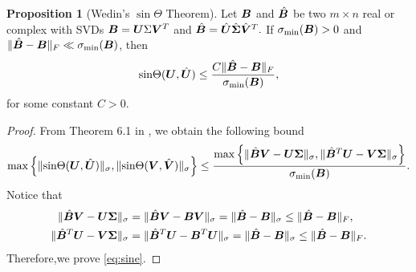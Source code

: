 \documentclass[12pt]{article}
\theoremstyle{definition}
\newtheorem{prop}{Proposition}
\theoremstyle{definition}
\begin{document}
\begin{prop}[Wedin's $\sin\Theta$ Theorem]\label{prop:sinebound}
Let $\bm B$ and $\hat{\bm B}$ be two $m\times n$ real or complex with SVDs $\bm B = \bm{U}\Sigma\bm{V}^T$ and $\hat{\bm B} = \hat{\bm{U}}\hat{\bm \Sigma}\hat{\bm{V}}^T.$ If $\sigma_{\text{min}}(\bm B)>0$ and $\lVert\hat{\bm B}-\bm B\rVert_F\ll \sigma_{\text{min}}(\bm B)$, then
\begin{align}\label{eq:sine}
    \text{sin}\Theta(\bm{U},\hat{\bm{U}}) \leq \frac{C\lVert\hat{\bm B}-\bm B\rVert_F}{\sigma_{\text{min}}(\bm B)},
\end{align}
for some constant $C>0$.
\end{prop}
\begin{proof}
From Theorem 6.1 in \cite{wang2017tensor}, we  obtain the following bound 
\begin{align}
    \max\left\{\lVert\text{sin}\Theta(\bm{U},\hat{\bm{U}})\rVert_\sigma,\lVert\text{sin}\Theta(\bm{V},\hat{\bm{V}})\rVert_\sigma\right\}\leq \frac{\max\left\{\lVert\hat{\bm B}\bm{V}-\bm{U}\bm \Sigma\rVert_\sigma,\lVert\hat{\bm B}^T\bm{U}-\bm{V}\bm \Sigma\rVert_\sigma\right\}}{\sigma_{\text{min}}(\bm B)}.
\end{align}
Notice that
\begin{align}
    \lVert\hat{\bm B}\bm{V}-\bm{U}\bm \Sigma\rVert_\sigma &= \lVert\hat{\bm B}\bm{V}-\bm B\bm{V}\rVert_\sigma = \lVert\hat{\bm B}-\bm B\rVert_\sigma \leq \lVert\hat{\bm B}-\bm B\rVert_F,\\
    \lVert\hat{\bm B}^T\bm{U}-\bm{V}\bm \Sigma\rVert_\sigma &= \lVert\hat{\bm B}^T\bm{U}-\bm B^T\bm{U}\rVert_\sigma = \lVert\hat{\bm B}-\bm B\rVert_\sigma \leq \lVert\hat{\bm B}-\bm B\rVert_F.
\end{align}
Therefore,we prove \eqref{eq:sine}.
\end{proof}
\end{document}
